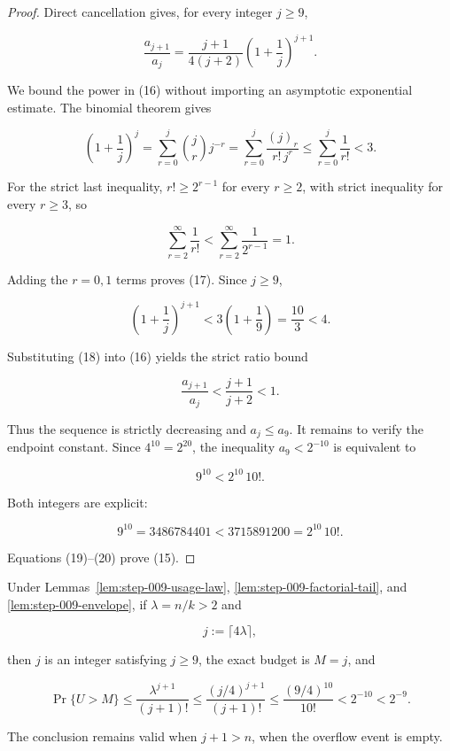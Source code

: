 \begin{proof}
Direct cancellation gives, for every integer \(j\ge9\),

\[
\frac{a_{j+1}}{a_j}
=\frac{j+1}{4(j+2)}
 \left(1+\frac1j\right)^{j+1}.
\tag{16}
\]

We bound the power in (16) without importing an asymptotic exponential
estimate. The binomial theorem gives

\[
\left(1+\frac1j\right)^j
=\sum_{r=0}^j \binom jr j^{-r}
=\sum_{r=0}^j \frac{(j)_r}{r!\,j^r}
\le\sum_{r=0}^j\frac1{r!}
<3.
\tag{17}
\]

For the strict last inequality, \(r!\ge2^{r-1}\) for every \(r\ge2\),
with strict inequality for every \(r\ge3\), so

\[
\sum_{r=2}^{\infty}\frac1{r!}
<\sum_{r=2}^{\infty}\frac1{2^{r-1}}=1.
\]

Adding the \(r=0,1\) terms proves (17). Since \(j\ge9\),

\[
\left(1+\frac1j\right)^{j+1}
<3\left(1+\frac19\right)
=\frac{10}{3}<4.
\tag{18}
\]

Substituting (18) into (16) yields the strict ratio bound

\[
\frac{a_{j+1}}{a_j}
<\frac{j+1}{j+2}<1.
\tag{19}
\]

Thus the sequence is strictly decreasing and \(a_j\le a_9\). It remains
to verify the endpoint constant. Since \(4^{10}=2^{20}\), the inequality
\(a_9<2^{-10}\) is equivalent to

\[
9^{10}<2^{10}\,10!.
\]

Both integers are explicit:

\[
9^{10}=3486784401
<3715891200=2^{10}\,10!.
\tag{20}
\]

Equations (19)--(20) prove (15). \end{proof}

\begin{lemma}\label{lem:step-009-large-mean}
Under Lemmas~\ref{lem:step-009-usage-law},
\ref{lem:step-009-factorial-tail}, and
\ref{lem:step-009-envelope}, if \(\lambda=n/k>2\) and

\[
j:=\lceil4\lambda\rceil,
\tag{21}
\]

then \(j\) is an integer satisfying \(j\ge9\), the exact budget is
\(M=j\), and

\[
\Pr\{U>M\}
\le\frac{\lambda^{j+1}}{(j+1)!}
\le\frac{(j/4)^{j+1}}{(j+1)!}
\le\frac{(9/4)^{10}}{10!}
<2^{-10}<2^{-9}.
\tag{22}
\]

The conclusion remains valid when \(j+1>n\), when the overflow event is
empty.
\end{lemma}

